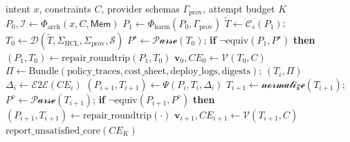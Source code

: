 \documentclass[acmsmall,screen,review,anonymous]{acmart}
\begin{document}



\begin{algorithm}[t]
\caption{MACOG Orchestration with Counterexample-Guided Repair (No Fine-Tuning)}
\label{alg:macog}
\begin{algorithmic}[1]
\Require intent $x$, constraints $C$, provider schemas $\Gamma_{\text{prov}}$, attempt budget $K$
\State $P_0, \mathcal{I} \gets \Phi_{\text{arch}}(x, C, \mathsf{Mem})$ 
\State $P_1 \gets \Phi_{\text{harm}}(P_0, \Gamma_{\text{prov}})$ 
\State $\widetilde{T} \gets \mathcal{C}_s(P_1)$; $T_0 \gets \mathcal{D}(\widetilde{T}, \Sigma_{\text{HCL}}, \Sigma_{\text{prov}}, \mathcal{S})$ 
\State $P^\star \gets \mathcal{P\!arse}(T_0)$; \textbf{if} $\neg\mathrm{equiv}(P_1,P^\star)$ \textbf{then} $(P_1,T_0)\gets \mathrm{repair\_roundtrip}(P_1,T_0)$
\State $\mathbf{v}_0, CE_0 \gets \mathcal{V}(T_0, C)$ 
     \State $\Pi \gets \mathrm{Bundle}(\text{policy\_traces},\text{cost\_sheet},\text{deploy\_logs},\text{digests})$; \Return $(T_i,\Pi)$
  \EndIf
  \State $\Delta_i \gets \mathcal{E2E}(CE_i)$ 
  \State $(P_{i+1}, T_{i+1}) \gets \Psi(P_i, T_i, \Delta_i)$ 
  \State $T_{i+1} \gets \mathcal{normalize}(T_{i+1})$; $P^\diamond \gets \mathcal{P\!arse}(T_{i+1})$; \textbf{if} $\neg\mathrm{equiv}(P_{i+1},P^\diamond)$ \textbf{then} $(P_{i+1},T_{i+1})\gets \mathrm{repair\_roundtrip}(\cdot)$
  \State $\mathbf{v}_{i+1}, CE_{i+1} \gets \mathcal{V}(T_{i+1}, C)$
\EndFor
\State \Return $\mathrm{report\_unsatisfied\_core}(CE_{K})$
\end{algorithmic}
\end{algorithm}
\end{document}

